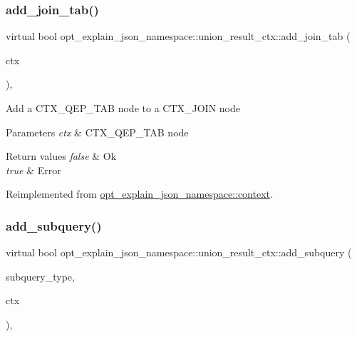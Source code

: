 \subsubsection{\texorpdfstring{add\+\_\+join\+\_\+tab()}{add\_join\_tab()}}
{\footnotesize\ttfamily virtual bool opt\+\_\+explain\+\_\+json\+\_\+namespace\+::union\+\_\+result\+\_\+ctx\+::add\+\_\+join\+\_\+tab (\begin{DoxyParamCaption}\item[{\mbox{\hyperlink{classopt__explain__json__namespace_1_1joinable__ctx}{joinable\+\_\+ctx}} $\ast$}]{ctx }\end{DoxyParamCaption})\hspace{0.3cm}{\ttfamily [inline]}, {\ttfamily [virtual]}}

Add a C\+T\+X\+\_\+\+Q\+E\+P\+\_\+\+T\+AB node to a C\+T\+X\+\_\+\+J\+O\+IN node


\begin{DoxyParams}{Parameters}
{\em ctx} & C\+T\+X\+\_\+\+Q\+E\+P\+\_\+\+T\+AB node\\
\hline
\end{DoxyParams}

\begin{DoxyRetVals}{Return values}
{\em false} & Ok \\
\hline
{\em true} & Error \\
\hline
\end{DoxyRetVals}


Reimplemented from \mbox{\hyperlink{classopt__explain__json__namespace_1_1context_a3f7a03f0bf2a519a19b84cb5a99ee304}{opt\+\_\+explain\+\_\+json\+\_\+namespace\+::context}}.

\mbox{\label{classopt__explain__json__namespace_1_1union__result__ctx_a9e6c30603c339d970f2c8609fdda759a}} 
\subsubsection{\texorpdfstring{add\+\_\+subquery()}{add\_subquery()}}
{\footnotesize\ttfamily virtual bool opt\+\_\+explain\+\_\+json\+\_\+namespace\+::union\+\_\+result\+\_\+ctx\+::add\+\_\+subquery (\begin{DoxyParamCaption}\item[{subquery\+\_\+list\+\_\+enum}]{subquery\+\_\+type,  }\item[{\mbox{\hyperlink{classopt__explain__json__namespace_1_1subquery__ctx}{subquery\+\_\+ctx}} $\ast$}]{ctx }\end{DoxyParamCaption})\hspace{0.3cm}{\ttfamily [inline]}, {\ttfamily [virtual]}}

